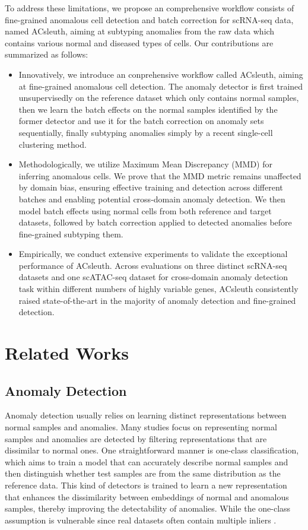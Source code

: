 \documentclass{article}
\begin{document}
To address these limitations, we propose an comprehensive workflow consists of fine-grained anomalous cell 
detection and batch correction for scRNA-seq data, named ACsleuth, aiming at 
subtyping anomalies from the raw data which contains various normal and diseased types of 
cells. Our contributions are summarized as follows:
\begin{itemize}
\item Innovatively, we introduce an conprehensive workflow called ACsleuth, aiming at 
fine-grained anomalous cell detection. The anomaly detector is first trained 
unsupervisedly on the reference dataset which only contains normal samples, then we learn 
the batch effects on the normal samples identified by the former detector and use it for 
the batch correction on anomaly sets sequentially, finally subtyping anomalies simply by a recent 
single-cell clustering method.
\item Methodologically, we utilize Maximum Mean Discrepancy (MMD) for inferring anomalous cells. 
We prove that the MMD metric remains unaffected by domain bias, ensuring effective training and  
detection across different batches and enabling potential cross-domain anomaly detection. We then 
model batch effects using normal cells from both reference and target datasets, followed by batch 
correction applied to detected anomalies before fine-grained subtyping them.
\item Empirically, we conduct extensive experiments to validate the exceptional performance 
of ACsleuth. Across evaluations on three distinct scRNA-seq datasets and one scATAC-seq dataset 
for cross-domain anomaly detection task within different numbers of highly variable genes, 
ACsleuth consistently raised state-of-the-art in the majority of anomaly detection and 
fine-grained detection.
\end{itemize}

\section{Related Works}
\subsection{Anomaly Detection}
Anomaly detection usually relies on learning distinct representations between normal 
samples and anomalies. Many studies focus on representing normal samples and 
anomalies are detected by filtering representations that are dissimilar to normal ones. 
One straightforward manner is one-class classification, which aims to train a model that 
can accurately describe normal samples and then distinguish whether test samples are from 
the same distribution as the reference data. This kind of detectors is trained to learn a 
new representation \cite{RCA,liznerski} that 
enhances the dissimilarity between embeddings of normal and anomalous samples, thereby 
improving the detectability of anomalies. While the one-class assumption is vulnerable 
since real datasets often contain multiple inliers \cite{SLAD}.
\end{document}
